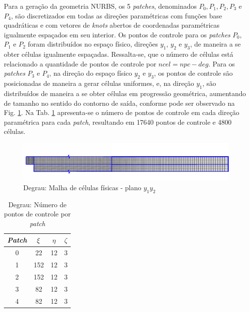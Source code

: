 \documentclass[tese_patricia]{subfiles}
\begin{document}
Para a geração da geometria NURBS, os 5 \textit{patches}, denominados $P_{0},P_{1},P_{2},P_{3}$ e $P_{4}$, são discretizados em todas as direções paramétricas com funções base quadráticas e com vetores de \textit{knots} abertos de coordenadas paramétricas igualmente espaçados em seu interior. Os pontos de controle para os \textit{patches} $P_0$, $P_1$ e $P_2$ foram distribuídos no espaço físico, direções $y_1$, $y_2$ e $y_3$, de maneira a se obter células igualmente espaçadas. Ressalta-se, que o número de células está relacionado a quantidade de pontos de controle por $ncel = npc-deg$.
Para os \textit{patches} $P_3$ e $P_4$, na direção do espaço físico $y_2$ e $y_3$, os pontos de controle são posicionadas de maneira a gerar células uniformes, e, na direção $y_1$, são distribuídos de maneira a se obter células em progressão geométrica, aumentando de tamanho no sentido do contorno de saída, conforme pode ser observado na Fig. \ref{fig:degrau_malha}. Na Tab. \ref{tab:degrau_discretização_patches} apresenta-se o número de pontos de controle em cada direção paramétrica para cada \textit{patch}, resultando em 17640 pontos de controle e 4800 células.

\begin{figure}[htb!]
	\centering
	\includegraphics[scale=2.0,trim=0cm 0.1cm 0cm 0cm, clip=true]{Imagens/Cap3/degrau_malha.pdf}
		\vspace{-0.5cm} 
	\caption{Degrau: Malha de células físicas - plano $y_1$$y_2$}
	\label{fig:degrau_malha}
\end{figure}

\begin{center}
	\begin{table}[h!]
		\caption{Degrau: Número de pontos de controle por \textit{patch}}
		\centering
		\begin{tabular}{|c | c | c| c|} 
			\hline
			\textit{Patch} & $\xi$ & $\eta$ & $\zeta$ \\ 
			\hline
			0 & 22 & 12 & 3 \\ 
			\hline
			1 & 152 & 12 & 3\\
			\hline
			2 & 152 & 12 & 3\\
			\hline
			3 & 82 & 12 & 3\\
			\hline
			4 & 82 & 12 & 3\\
			\hline
		\end{tabular}
		\label{tab:degrau_discretização_patches}
	\end{table}
\end{center}
\end{document}

